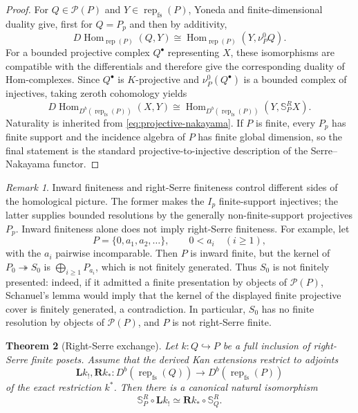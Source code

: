 \documentclass[12pt,reqno]{amsart}
\newtheorem{theorem}{Theorem}[section]
\theoremstyle{definition}
\theoremstyle{remark}
\newtheorem{remark}[theorem]{Remark}
\newcommand{\Rep}{\operatorname{rep}}
\newcommand{\Hom}{\operatorname{Hom}}
\begin{document}
\begin{proof}
For $Q\in\mathcal P(P)$ and $Y\in\Rep_{\mathrm{fs}}(P)$, Yoneda and
finite-dimensional duality give, first for $Q=P_p$ and then by additivity,
\[
D\Hom_{\Rep(P)}(Q,Y)
\cong
\Hom_{\Rep(P)}(Y,\nu_P^0Q).
\]
For a bounded projective complex $Q^\bullet$ representing $X$, these
isomorphisms are compatible with the differentials and therefore give the
corresponding duality of Hom-complexes.  Since $Q^\bullet$ is $K$-projective
and $\nu_P^0(Q^\bullet)$ is a bounded complex of injectives, taking
zeroth cohomology yields
\[
D\Hom_{D^b(\Rep_{\mathrm{fs}}(P))}(X,Y)
\cong
\Hom_{D^b(\Rep_{\mathrm{fs}}(P))}(Y,\mathbb S_P^R X).
\]
Naturality is inherited from \eqref{eq:projective-nakayama}.  If $P$ is
finite, every $P_p$ has finite support and the incidence algebra of $P$ has
finite global dimension, so the final statement is the standard
projective-to-injective description of the Serre--Nakayama functor.
\end{proof}

\begin{remark}\label{rem:inward-not-serre}
Inward finiteness and right-Serre finiteness control different sides of the
homological picture.  The former makes the $I_p$ finite-support injectives;
the latter supplies bounded resolutions by the generally non-finite-support
projectives $P_p$.  Inward finiteness alone does not imply right-Serre
finiteness.  For example, let
\[
P=\{0,a_1,a_2,\ldots\},
\qquad
0<a_i\quad(i\ge1),
\]
with the $a_i$ pairwise incomparable.  Then $P$ is inward finite, but the
kernel of $P_0\twoheadrightarrow S_0$ is
$\bigoplus_{i\ge1}P_{a_i}$, which is not finitely generated.  Thus $S_0$
is not finitely presented: indeed, if it admitted a finite presentation by
objects of $\mathcal P(P)$, Schanuel's lemma would imply that the kernel of
the displayed finite projective cover is finitely generated, a contradiction.
In particular, $S_0$ has no finite resolution by objects of
$\mathcal P(P)$, and $P$ is not right-Serre finite.
\end{remark}

\begin{theorem}[Right-Serre exchange]\label{thm:right-serre-exchange}
Let $k:Q\hookrightarrow P$ be a full inclusion of right-Serre finite posets.
Assume that the derived Kan extensions restrict to adjoints
\[
\mathbf Lk_!,\mathbf Rk_*:
D^b(\Rep_{\mathrm{fs}}(Q))\longrightarrow
D^b(\Rep_{\mathrm{fs}}(P))
\]
of the exact restriction $k^*$.  Then there is a canonical natural
isomorphism
\begin{equation}\label{eq:general-right-serre-exchange}
\boxed{\mathbb S_P^R\circ\mathbf Lk_!
\simeq\mathbf Rk_*\circ\mathbb S_Q^R.}
\end{equation}
\end{theorem}
\end{document}
